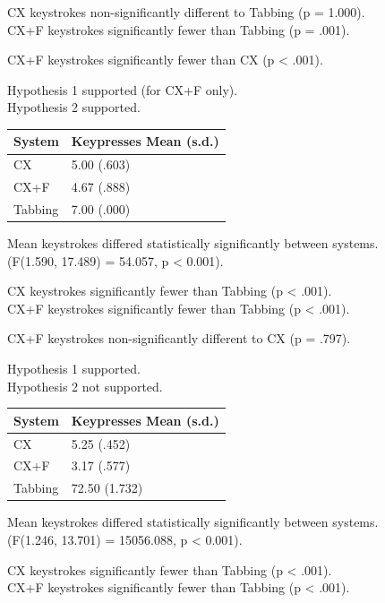 \documentclass[11pt,openright,a4paper]{report}
\begin{document}
CX keystrokes non-significantly different to Tabbing (p = 1.000).\\
CX+F keystrokes significantly fewer than Tabbing (p = .001).

CX+F keystrokes significantly fewer than CX (p < .001).

Hypothesis 1 supported (for CX+F only).\\
Hypothesis 2 supported.

\begin{tabular}{l l}
\hline\hline %
System & Keypresses Mean (s.d.) \\ [0.5ex] %
\hline %
CX & 5.00 (.603)\\
CX+F & 4.67 (.888)\\
Tabbing & 7.00 (.000)\\ [1ex] %
\hline %
\end{tabular}

Mean keystrokes differed statistically significantly between systems.\\
(F(1.590, 17.489) = 54.057, p < 0.001).

CX keystrokes significantly fewer than Tabbing (p < .001).\\
CX+F keystrokes significantly fewer than Tabbing (p < .001).

CX+F keystrokes non-significantly different to CX (p = .797).

Hypothesis 1 supported.\\
Hypothesis 2 not supported.

\begin{tabular}{l l}
\hline\hline %
System & Keypresses Mean (s.d.) \\ [0.5ex] %
\hline %
CX & 5.25 (.452)\\
CX+F & 3.17 (.577)\\
Tabbing & 72.50 (1.732)\\ [1ex] %
\hline %
\end{tabular}

Mean keystrokes differed statistically significantly between systems.\\
(F(1.246, 13.701) = 15056.088, p < 0.001).

CX keystrokes significantly fewer than Tabbing (p < .001).\\
CX+F keystrokes significantly fewer than Tabbing (p < .001).
\end{document}
